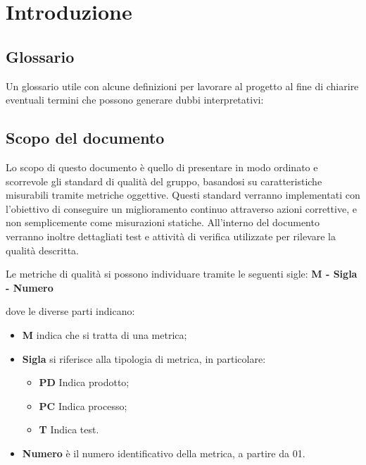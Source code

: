 \chapter{Introduzione}

\section{Glossario}
Un glossario utile con alcune definizioni per lavorare al progetto al fine di chiarire eventuali termini che possono generare dubbi interpretativi:

\section{Scopo del documento}
Lo scopo di questo documento è quello di presentare in modo ordinato e scorrevole gli standard di qualità del gruppo, basandosi su caratteristiche misurabili tramite metriche oggettive. Questi standard verranno implementati con l'obiettivo di conseguire un miglioramento continuo attraverso azioni correttive, e non semplicemente come misurazioni statiche. All'interno del documento verranno inoltre dettagliati test e attività di verifica utilizzate per rilevare la qualità descritta.

Le metriche di qualità si possono individuare tramite le seguenti sigle: \textbf{M - Sigla - Numero}

dove le diverse parti indicano:

\begin{itemize}
    \item \textbf{M} indica che si tratta di una metrica;
    \item \textbf{Sigla} si riferisce alla tipologia di metrica, in particolare:
    \begin{itemize}
        \item \textbf{PD} Indica prodotto;
        \item \textbf{PC} Indica processo;
        \item \textbf{T} Indica test.
    \end{itemize}
    \item \textbf{Numero} è il numero identificativo della metrica, a partire da 01.
\end{itemize}

